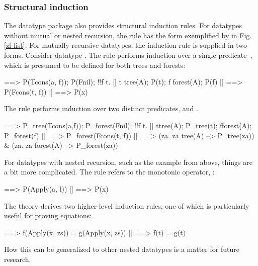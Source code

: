 \subsubsection{Structural induction}

The datatype package also provides structural induction rules.  For datatypes
without mutual or nested recursion, the rule has the form exemplified by
 in Fig.\ts\ref{zf-list}.  For mutually recursive
datatypes, the induction rule is supplied in two forms.  Consider datatype
.  The rule  performs induction over a
single predicate~, which is presumed to be defined for both trees
and forests:
\begin{ttbox}\isastyleminor
[| x \isasymin tree_forest(A);
   !!a f. [| a \isasymin A; f \isasymin forest(A); P(f) |] ==> P(Tcons(a, f)); 
   P(Fnil);
   !!f t. [| t \isasymin tree(A); P(t); f \isasymin forest(A); P(f) |]
          ==> P(Fcons(t, f)) 
|] ==> P(x)
\end{ttbox}
The rule  performs induction over two
distinct predicates,  and .
\begin{ttbox}\isastyleminor
[| !!a f.
      [| a{\isasymin}A; f{\isasymin}forest(A); P_forest(f) |] ==> P_tree(Tcons(a,f));
   P_forest(Fnil);
   !!f t. [| t{\isasymin}tree(A); P_tree(t); f{\isasymin}forest(A); P_forest(f) |]
          ==> P_forest(Fcons(t, f)) 
|] ==> ({\isasymforall}za. za \isasymin tree(A) --> P_tree(za)) &
    ({\isasymforall}za. za \isasymin forest(A) --> P_forest(za))
\end{ttbox}

For datatypes with nested recursion, such as the  example from
above, things are a bit more complicated.  The rule 
refers to the monotonic operator, :
\begin{ttbox}\isastyleminor
[| x \isasymin term(A);
   !!a l. [| a \isasymin A; l \isasymin list(Collect(term(A), P)) |] ==> P(Apply(a, l)) 
|] ==> P(x)
\end{ttbox}
The theory  derives two higher-level induction rules,
one of which is particularly useful for proving equations:
\begin{ttbox}\isastyleminor
[| t \isasymin term(A);
   !!x zs. [| x \isasymin A; zs \isasymin list(term(A)); map(f, zs) = map(g, zs) |]
           ==> f(Apply(x, zs)) = g(Apply(x, zs)) 
|] ==> f(t) = g(t)  
\end{ttbox}
How this can be generalized to other nested datatypes is a matter for future
research.


